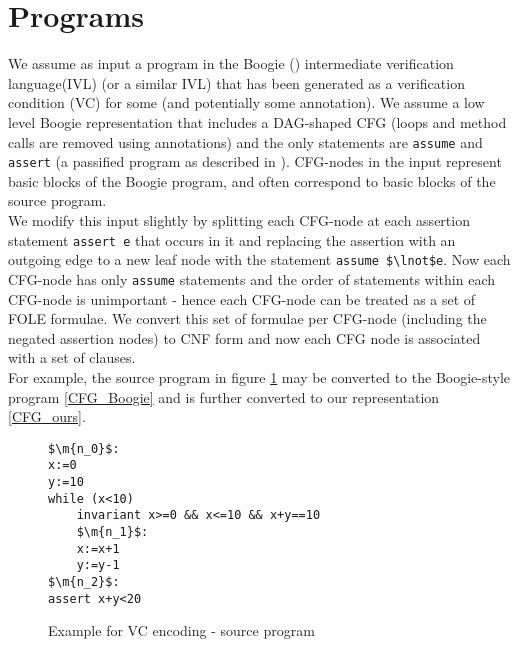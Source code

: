 \bigskip

\section*{Programs}\label{section:preliminaries_programs}
We assume as input a program in the Boogie (\cite{BarnettCDJL05}) intermediate verification language(IVL) (or a similar IVL) that has been generated as a verification condition (VC) for some  (and potentially some annotation).
We assume a low level Boogie representation that includes a DAG-shaped CFG (loops and method calls are removed using annotations) and the only statements are \lstinline|assume| and \lstinline|assert| (a passified program as described in \cite{Leino:2005:EWP:1066417.1710882}). CFG-nodes in the input represent basic blocks of the Boogie program, and often correspond to basic blocks of the source program.\\
We modify this input slightly by splitting each CFG-node at each assertion statement \lstinline|assert e| that occurs in it and replacing the assertion with an outgoing edge to a new leaf node with the statement \lstinline|assume $\lnot$e|. 
Now each CFG-node has only \lstinline|assume| statements and the order of statements within each CFG-node is unimportant - hence each CFG-node can be treated as a set of FOLE formulae. 
We convert this set of formulae per CFG-node (including the negated assertion nodes) to CNF form and now each CFG node is associated with a set of clauses. \\
For example, the source program in figure \ref{CFG_source_program} may be converted to the Boogie-style program \ref{CFG_Boogie} and is further converted to our representation \ref{CFG_ours}.
\begin{figure}
\begin{lstlisting}
$\m{n_0}$:
x:=0
y:=10
while (x<10)
	invariant x>=0 && x<=10 && x+y==10
	$\m{n_1}$:
	x:=x+1
	y:=y-1
$\m{n_2}$:
assert x+y<20
\end{lstlisting}
\caption{Example for VC encoding - source program}
\label{CFG_source_program}
\end{figure}

